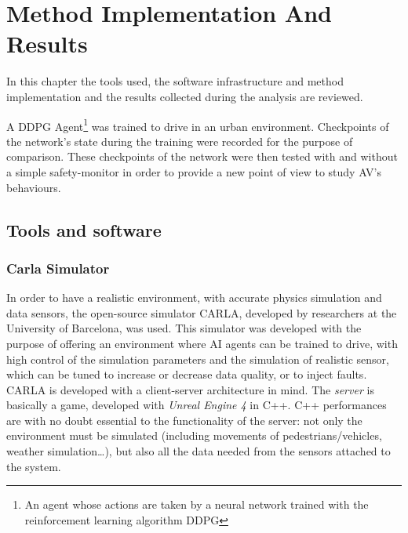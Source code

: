\chapter{Method Implementation And Results}

In this chapter the tools used, the software infrastructure and method implementation and the results collected during the analysis are reviewed.

A DDPG Agent\footnote{An agent whose actions are taken by a neural network trained with the reinforcement learning algorithm DDPG} was trained to drive in an urban environment. Checkpoints of the network's state during the training were recorded for the purpose of comparison. These checkpoints of the network were then tested with and without a simple safety-monitor in order to provide a new point of view to study AV's behaviours.

\section{Tools and software}

\subsection{Carla Simulator}

In order to have a realistic environment, with accurate physics simulation and data sensors, the open-source simulator CARLA\cite{carla}, developed by researchers at the University of Barcelona, was used. This simulator was developed with the purpose of offering an environment where AI agents can be trained to drive, with high control of the simulation parameters and the simulation of realistic sensor, which can be tuned to increase or decrease data quality, or to inject faults.\newline
CARLA is developed with a client-server architecture in mind. The \textsl{server} is basically a game, developed with \textsl{Unreal Engine 4} in C++. C++ performances are with no doubt essential to the functionality of the server: not only the environment must be simulated (including movements of pedestrians/vehicles, weather simulation\dots), but also all the data needed from the sensors attached to the system.\newline


